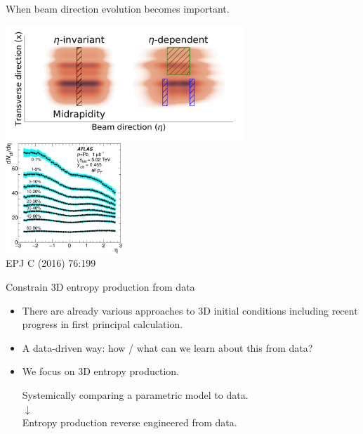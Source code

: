 \documentclass[11pt]{beamer}
\begin{document}
\begin{frame}{When beam direction evolution becomes important.}
\begin{overprint}
\includegraphics[width=0.67\textwidth]{nuclei_demo_02.pdf}
\includegraphics[width=0.33\textwidth]{pPb-ATLAS.png}\\
\hspace{9cm}\tiny EPJ C (2016) 76:199
\end{overprint}

\end{frame}

\begin{frame}{Constrain 3D entropy production from data}
\begin{itemize}
\item There are already various approaches to 3D initial conditions including recent progress in first principal calculation.
\item A data-driven way: how / what can we learn about this from data?
\item We focus on 3D entropy production.
\begin{center}
\colorbox{orange!40}{Systemically comparing a parametric model to data.}\\
$\downarrow$ \\
\colorbox{orange!40}{Entropy production reverse engineered from data.}
\end{center}
\end{itemize}
\end{frame}
\end{document}
